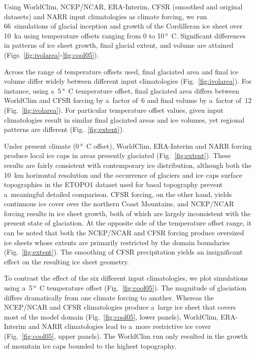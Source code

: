 \documentclass[tc, ms]{copernicus}
\begin{document}
Using WorldClim, NCEP/NCAR, ERA-Interim, CFSR (smoothed and original datasets) and NARR input climatologies as climate forcing, we run 66~simulations of glacial inception and growth of the Cordilleran ice sheet over 10~ka using temperature offsets ranging from 0 to 10\,\unit{\degree C}. Significant differences in patterns of ice sheet growth, final glacial extent, and volume are attained (Figs. \ref{fig:ivolarea}-\ref{fig:cool05}).

Across the range of temperature offsets used, final glaciated area and final ice volume differ widely between different input climatologies (Fig.~\ref{fig:ivolarea}). For instance, using a~5\,\unit{\degree C} temperature offset, final glaciated area differs between WorldClim and CFSR forcing by a~factor of~6 and final volume by a~factor of~12 (Fig.~\ref{fig:ivolarea}). For particular temperature offset values, given input climatologies result in similar final glaciated areas and ice volumes, yet regional patterns are different (Fig.~\ref{fig:extent}).

Under present climate (0\,\unit{\degree C} offset), WorldClim, ERA-Interim and NARR forcing produce local ice caps in areas presently glaciated (Fig.~\ref{fig:extent}). These results are fairly consistent with contemporary ice distribution, although both the 10~km horizontal resolution and the occurrence of glaciers and ice caps surface topographies in the ETOPO1 dataset used for basal topography prevent a~meaningful detailed comparison. CFSR forcing, on the other hand, yields continuous ice cover over the northern Coast Mountains, and NCEP/NCAR forcing results in ice sheet growth, both of which are largely inconsistent with the present state of glaciation. At the opposite side of the temperature offset range, it can be noted that both the NCEP/NCAR and CFSR forcing produce oversized ice sheets whose extents are primarily restricted by the domain boundaries (Fig.~\ref{fig:extent}). The smoothing of CFSR precipitation yields an insignificant effect on the resulting ice sheet geometry.

To contrast the effect of the six different input climatologies, we plot simulations using a~5\,\unit{\degree C} temperature offset (Fig.~\ref{fig:cool05}). The magnitude of glaciation differs dramatically from one climate forcing to another. Whereas the NCEP/NCAR and CFSR climatologies produce a~large ice sheet that covers most of the model domain (Fig.~\ref{fig:cool05}, lower panels), WorldClim, ERA-Interim and NARR climatologies lead to a~more restrictive ice cover (Fig.~\ref{fig:cool05}, upper panels). The WorldClim run only resulted in the growth of mountain ice caps bounded to the highest topography.
\end{document}
